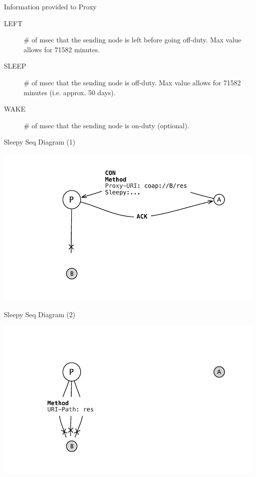 \documentclass{beamer}
\begin{document}
\begin{frame}[fragile]{Information provided to Proxy}

\begin{description}
 \item[LEFT] \# of msec that the sending node is left before going off-duty.  Max value allows for 71582 minutes.
 \item[SLEEP] \# of msec that the sending node is off-duty.  Max value allows for 71582 minutes (i.e. approx. 50 days).
 \item[WAKE] \# of msec that the sending node is on-duty (optional).
\end{description}
\end{frame}

\begin{frame}{Sleepy Seq Diagram (1)}
 \begin{center}
  \includegraphics[width=\textwidth]{../../share/images/sleepy1.pdf}
 \end{center}
\end{frame}

\begin{frame}{Sleepy Seq Diagram (2)}
 \begin{center}
  \includegraphics[width=\textwidth]{../../share/images/sleepy2.pdf}
 \end{center}
\end{frame}
\end{document}
